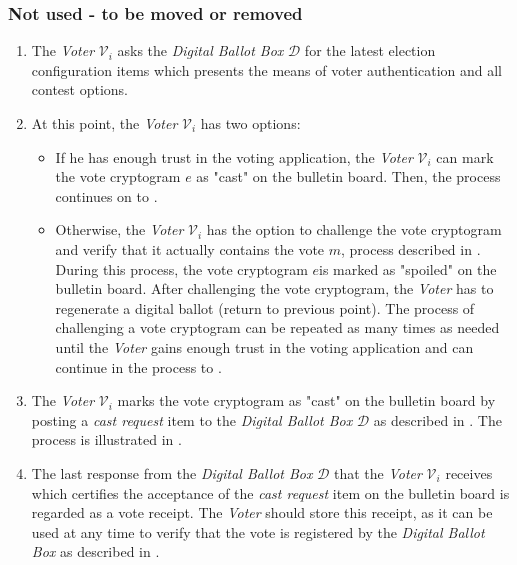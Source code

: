 \subsubsection{Not used - to be moved or removed}
\begin{enumerate}
    \item The \textit{Voter} $\mathcal{V}_i$ asks the \textit{Digital Ballot Box} $\mathcal{D}$ for the latest election configuration items which presents the means of voter authentication and all contest options.
    
    \item At this point, the \textit{Voter} $\mathcal{V}_i$ has two options:
    \begin{itemize}
        \item If he has enough trust in the voting application, the \textit{Voter} $\mathcal{V}_i$ can mark the vote cryptogram $e$ as "cast" on the bulletin board. Then, the process continues on to .
        
        \item Otherwise, the \textit{Voter} $\mathcal{V}_i$ has the option to challenge the vote cryptogram and verify that it actually contains the vote $m$, process described in . During this process, the vote cryptogram $e$is marked as "spoiled" on the bulletin board. After challenging the vote cryptogram, the \textit{Voter} has to regenerate a digital ballot (return to previous point). The process of challenging a vote cryptogram can be repeated as many times as needed until the \textit{Voter} gains enough trust in the voting application and can continue in the process to .
    \end{itemize}
    
    \item \label{itm: cast vote} The \textit{Voter} $\mathcal{V}_i$ marks the vote cryptogram as "cast" on the bulletin board by posting a \textit{cast request} item to the \textit{Digital Ballot Box} $\mathcal{D}$ as described in . The process is illustrated in .
    
    \item The last response from the \textit{Digital Ballot Box} $\mathcal{D}$ that the \textit{Voter} $\mathcal{V}_i$ receives which certifies the acceptance of the \textit{cast request} item on the bulletin board is regarded as a vote receipt. The \textit{Voter} should store this receipt, as it can be used at any time to verify that the vote is registered by the \textit{Digital Ballot Box} as described in .
\end{enumerate}
\color{black}








